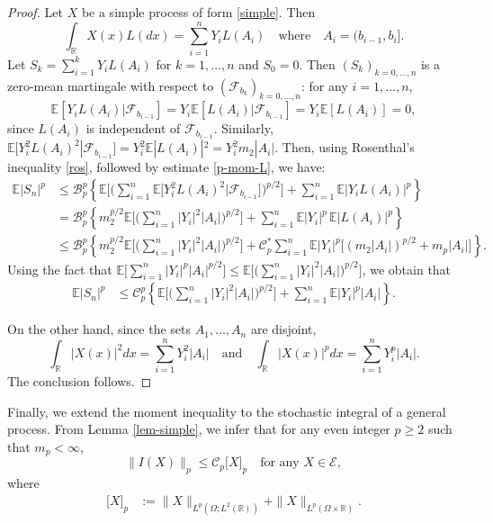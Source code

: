 \documentclass[12pt]{article}
\def\cB{\mathcal{B}}
\def\cC{\mathcal{C}}
\def\cE{\mathcal{E}}
\def\cF{\mathcal{F}}
\def\bE{\mathbb{E}}
\def\bR{\mathbb{R}}
\begin{document}
\begin{proof}
Let $X$ be a simple process of form \eqref{simple}. Then 
\[
\int_{\bR}X(x)L(dx)=\sum_{i=1}^n Y_i L(A_i) \quad \mbox{where} \quad A_i=(b_{i-1},b_i].
\] 
Let $S_k=\sum_{i=1}^k Y_i L(A_i)$ for $k=1,\ldots,n$ and $S_0=0$. Then $(S_k)_{k=0,\ldots,n}$ is a zero-mean martingale with respect to $(\cF_{b_k})_{k=0,\ldots,n}$: 
for any $i=1,\ldots,n$,
\[
\bE[Y_i L(A_i)|\cF_{b_{i-1}}]=Y_i \bE[L(A_i)|\cF_{b_{i-1}}]=Y_i \bE[L(A_i)]=0,
\] 
since $L(A_i)$ is independent of $\cF_{b_{i-1}}$. Similarly, $\bE \big[Y_i^2 L(A_i)^2|\cF_{b_{i-1}}\big] =Y_i^2 \bE|L(A_i)|^2=Y_i^2 m_2 |A_i|$.
Then, using Rosenthal's inequality \eqref{ros}, followed by estimate \eqref{p-mom-L}, we have:
\begin{align*}
\bE|S_n|^p & \leq \cB_p^p \left\{ \bE \Big[ \Big( \sum_{i=1}^n \bE \big[Y_i^2 L(A_i)^2|\cF_{b_{i-1}}\big] \Big)^{p/2} \Big]+\sum_{i=1}^{n}\bE \big|Y_i L(A_i)\big|^p \right\}\\
&=\cB_p^p \left\{ m_2^{p/2} \bE \Big[ \Big( \sum_{i=1}^n |Y_i|^2 |A_i|\Big)^{p/2} \Big]+\sum_{i=1}^{n} \bE |Y_i |^p \, \bE| L(A_i)|^p \right\} \\
& \leq \cB_p^p \left\{ m_2^{p/2} \bE \Big[ \Big( \sum_{i=1}^n  |Y_i|^2 |A_i|\Big)^{p/2} \Big]+\cC_p^* \sum_{i=1}^{n} \bE |Y_i |^p \big[ (m_2 |A_i|)^{p/2}+ m_p |A_i| \big] \right\}.
\end{align*}
Using the fact that $\bE \big[\sum_{i=1}^n |Y_i|^p |A_i|^{p/2}\big] \leq \bE\big[\big( \sum_{i=1}^n |Y_i|^2 |A_i| \big)^{p/2}\big]$, we obtain that
\begin{align*}
\bE|S_n|^p & \leq \cC_p^p \left\{ \bE \Big[ \Big( \sum_{i=1}^n  |Y_i|^2 |A_i|\Big)^{p/2} \Big]+ \sum_{i=1}^{n}\bE|Y_i|^p |A_i|\right\}.
\end{align*}

On the other hand, since the sets $A_1,\ldots,A_n$ are disjoint, 
\[
\int_{\bR}|X(x)|^2 dx=\sum_{i=1}^{n} Y_i^2|A_i| \quad \mbox{and} \quad \int_{\bR}|X(x)|^p dx=\sum_{i=1}^{n} Y_i^p|A_i|.
\]
The conclusion follows.
\end{proof}

Finally, we extend the moment inequality to the stochastic integral of a general process.
From Lemma \ref{lem-simple}, we infer that for any even integer $p\geq 2$ such that $m_p<\infty$,
\[
\|I(X)\|_p \leq \cC_p \big[X\big]_p \quad \mbox{for any $X\in \cE$},
\]
where
\begin{align*}
\big[X\big]_p 
& :=\|X\|_{L^p(\Omega;L^2(\bR))}+\|X\|_{L^p(\Omega \times \bR)}.
\end{align*}
\end{document}
